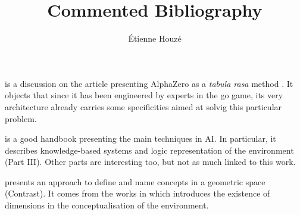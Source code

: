 \documentclass{article}
\title{Commented Bibliography}
\author{\'Etienne Houzé}
\date{}
\begin{document}
\maketitle
    \cite{marcus2018innateness} is a discussion on the article presenting AlphaZero as a \emph{tabula rasa} method \cite{silver2017mastering}. It objects that since it has been engineered by experts in the go game, its very architecture already carries some specificities aimed at solvig this particular problem.

    \cite{russell2016artificial} is a good handbook presenting the main techniques in AI. In particular, it describes knowledge-based systems and logic representation of the environment (Part III). Other parts are interesting too, but not as much linked to this work.

    \cite{dessalles2015conceptual}  presents an approach to define and name concepts in a geometric space (Contrast). It comes from the works in \cite{gardenfors2004conceptual} which introduces the existence of dimensions in the conceptualisation of the environment.

\newpage


\end{document}
